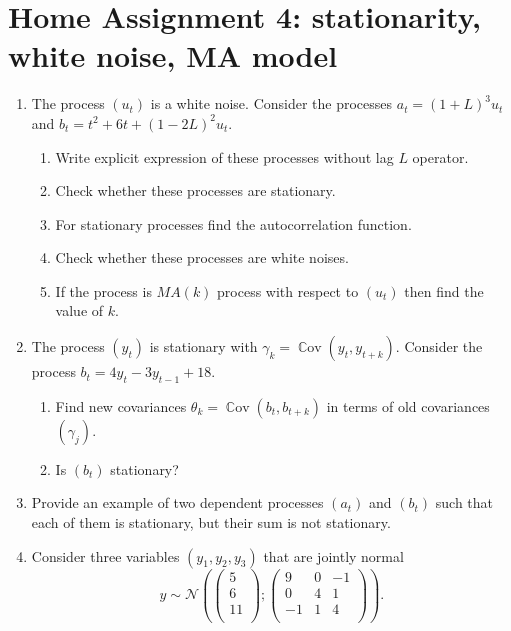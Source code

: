 \documentclass[12pt]{article}
\DeclareMathOperator{\Cov}{\mathbb{C}ov}
\newcommand \cN{\mathcal{N}}
\begin{document}
\section*{Home Assignment 4: stationarity, white noise, MA model}
\begin{enumerate}
  \item The process $(u_t)$ is a white noise. 
  Consider the processes $a_t = (1+L)^3 u_t$ and 
  $b_t = t^2 + 6t + (1-2L)^2 u_t$. %
  
  \begin{enumerate}
    \item Write explicit expression of these processes without lag $L$ operator.
    \item Check whether these processes are stationary.
    \item For stationary processes find the autocorrelation function. 
    \item Check whether these processes are white noises.
    \item If the process is $MA(k)$ process with respect to $(u_t)$ then find the value of $k$.  
    
  \end{enumerate}

  \item The process $(y_t)$ is stationary with $\gamma_k = \Cov(y_t, y_{t+k})$.
  Consider the process  $b_{t}=4y_{t} - 3 y_{t-1} + 18$.

  \begin{enumerate}
    \item Find new covariances $\theta_k = \Cov(b_t, b_{t+k})$ in terms of old covariances $(\gamma_j)$.
    \item Is $(b_t)$ stationary?
  \end{enumerate}

  \item Provide an example of two dependent processes $(a_t)$ and $(b_t)$ such that each of them is stationary, 
  but their sum is not stationary. 


  \item Consider three variables $(y_1, y_2, y_3)$ that are jointly normal
  \[
  y \sim \cN\left( \begin{pmatrix}
    5 \\
    6 \\
    11 \\
  \end{pmatrix}; \begin{pmatrix}
    9 & 0 & -1 \\
    0 & 4 & 1 \\
    -1 & 1 & 4 \\
  \end{pmatrix}  \right).  
  \]


\end{enumerate}
\end{document}
